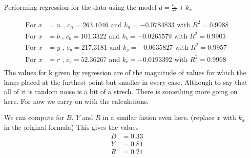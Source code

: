 \documentclass[12pt]{article}
\begin{document}

Performing regression for the data using the model $\displaystyle d = \frac{c_x}{x^2}+k_x$

\begin{align*}
    \text{For } x&=n \text{ , } c_n=263.1046 \text{ and } k_n=-0.0784833 \text{ with } R^{2}=0.9988 \\
    \text{For } x&=b \text{ , } c_b=101.3322 \text{ and } k_b=-0.0265579 \text{ with } R^{2}=0.9903 \\
    \text{For } x&=y \text{ , } c_y=217.3181 \text{ and } k_y=-0.0635827 \text{ with } R^{2}=0.9957 \\
    \text{For } x&=r \text{ , } c_r=52.36267 \text{ and } k_r=-0.0193392 \text{ with } R^{2}=0.9968 \\
\end{align*}
The values for k given by regression are of the magnitude of values for which the lamp placed at the furthest point but smaller in every case.
Although to say that all of it is random noise is a bit of a strech.
There is something more going on here.
For now we carry on with the calculations.

We can compute for $B$, $Y$ and $R$ in a similar fasion even here.
(replace $x$ with $k_x$ in the original formula)
This gives the values
\begin{align*}
    B &= 0.33 \\
    Y &= 0.81 \\
    R &= 0.24 
\end{align*}
\end{document}
